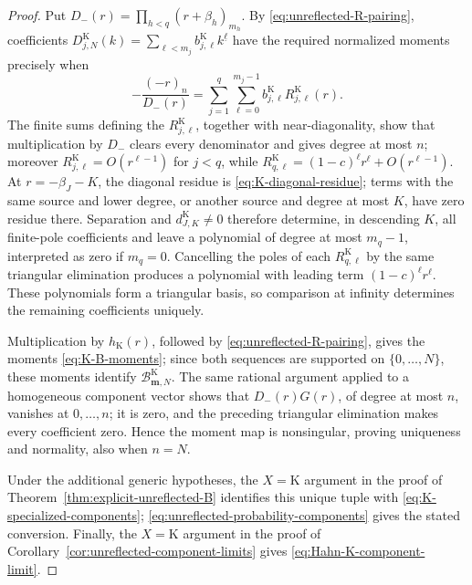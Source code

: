 \documentclass[10pt]{amsart}
\newcommand{\mm}{\boldsymbol m}
\newcommand{\fall}[2]{#1^{\underline{#2}}}
\theoremstyle{plain}
\theoremstyle{definition}
\theoremstyle{remark}
\begin{document}
\begin{proof}
Put \(D_-(r)=\prod_{h<q}(r+\beta_h)_{m_h}\). By
\eqref{eq:unreflected-R-pairing}, coefficients
\(D_{j,N}^{\mathrm K}(k)=\sum_{\ell<m_j}b_{j,\ell}^{\mathrm K}
\fall{k}{\ell}\) have the required normalized moments precisely when
\[
 -\frac{(-r)_n}{D_-(r)}
 =\sum_{j=1}^q\sum_{\ell=0}^{m_j-1}
 b_{j,\ell}^{\mathrm K}R_{j,\ell}^{\mathrm K}(r).
\]
The finite sums defining the \(R_{j,\ell}^{\mathrm K}\), together with
near-diagonality, show that multiplication by \(D_-\) clears every
denominator and gives degree at most \(n\); moreover
\(R_{j,\ell}^{\mathrm K}=O(r^{\ell-1})\) for \(j<q\), while
\(R_{q,\ell}^{\mathrm K}=(1-c)^\ell r^\ell+O(r^{\ell-1})\).
At \(r=-\beta_J-K\), the diagonal residue is
\eqref{eq:K-diagonal-residue}; terms with the same source and lower degree,
or another source and degree at most \(K\), have zero residue there.
Separation and \(d_{J,K}^{\mathrm K}\ne0\) therefore determine, in
descending \(K\), all finite-pole coefficients and leave a polynomial of
degree at most \(m_q-1\), interpreted as zero if \(m_q=0\). Cancelling the poles of each
\(R_{q,\ell}^{\mathrm K}\) by the same triangular elimination produces a
polynomial with leading term \((1-c)^\ell r^\ell\). These polynomials form
a triangular basis, so comparison at infinity determines the remaining
coefficients uniquely.

Multiplication by \(h_{\mathrm K}(r)\), followed by
\eqref{eq:unreflected-R-pairing}, gives the moments
\eqref{eq:K-B-moments}; since both sequences are supported on
\(\{0,\ldots,N\}\), these moments identify
\(\mathcal B_{\mm,N}^{\mathrm K}\). The same rational argument applied to
a homogeneous component vector shows that \(D_-(r)G(r)\), of degree at
most \(n\), vanishes at \(0,\ldots,n\); it is zero, and the preceding
triangular elimination makes every coefficient zero. Hence the moment map
is nonsingular, proving uniqueness and normality, also when \(n=N\).

Under the additional generic hypotheses, the \(X=\mathrm K\) argument in
the proof of Theorem~\ref{thm:explicit-unreflected-B} identifies this unique tuple with
\eqref{eq:K-specialized-components};
\eqref{eq:unreflected-probability-components} gives the stated conversion.
Finally, the \(X=\mathrm K\) argument in the proof of
Corollary~\ref{cor:unreflected-component-limits} gives
\eqref{eq:Hahn-K-component-limit}.
\end{proof}
\end{document}
